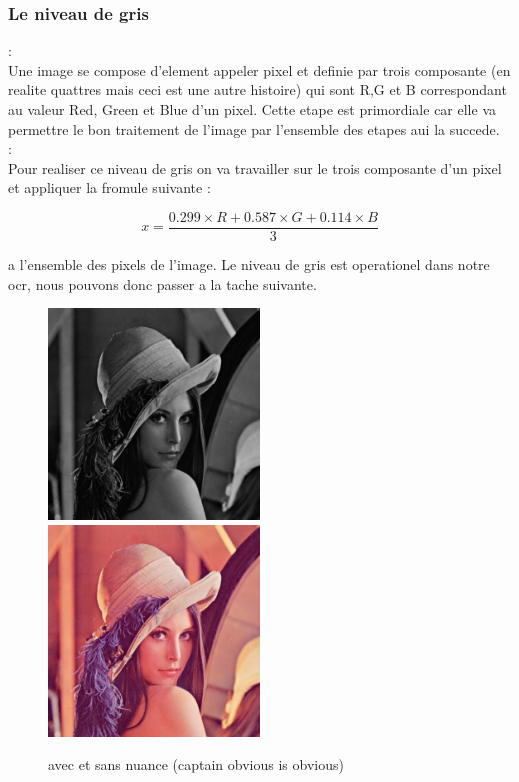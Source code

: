 \documentclass{article}
\begin{document}
\subsubsection{Le niveau de gris}
:\\
Une image se compose d'element appeler pixel et definie par trois composante (en realite quattres mais ceci est une autre histoire) qui sont R,G et B correspondant au valeur Red, Green et Blue d'un pixel. Cette etape est primordiale car elle va permettre le bon traitement de l'image par l'ensemble des etapes aui la succede.\\
:\\
Pour realiser ce niveau de gris on va travailler sur le trois composante d'un pixel et appliquer la fromule suivante :
\\
\begin{center}
\[x = \frac{0.299 \times R + 0.587 \times G + 0.114 \times B}{3}\]
\end{center}
a l'ensemble des pixels de l'image. Le niveau de gris est operationel dans notre ocr, nous pouvons donc passer a la tache suivante.
\begin{figure}[h]
\includegraphics[width=0.50\textwidth]{img/grey.png}
\includegraphics[width=0.50\textwidth]{img/lena.jpg}
\caption{avec et sans nuance (captain obvious is obvious)}
\end{figure}
\newpage{}
\end{document}
